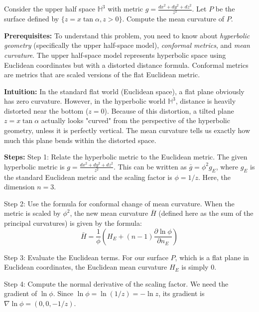 \begin{exercise}
\label{geometry:2021:4}
Consider the upper half space $\mathbb{H}^{3}$ with metric $g = \frac{dx^{2} + dy^{2} + dz^{2}}{z^{2}}$. Let $P$ be the surface defined by $\{z = x\tan\alpha, z > 0\}$. Compute the mean curvature of $P$.
\end{exercise}

\begin{solution}
\textbf{Prerequisites:}
To understand this problem, you need to know about \textit{hyperbolic geometry} (specifically the upper half-space model), \textit{conformal metrics}, and \textit{mean curvature}. The upper half-space model represents hyperbolic space using Euclidean coordinates but with a distorted distance formula. Conformal metrics are metrics that are scaled versions of the flat Euclidean metric.

\vspace{\baselineskip}
\textbf{Intuition:}
In the standard flat world (Euclidean space), a flat plane obviously has zero curvature. However, in the hyperbolic world $\mathbb{H}^3$, distance is heavily distorted near the bottom ($z=0$). Because of this distortion, a tilted plane $z = x \tan \alpha$ actually looks "curved" from the perspective of the hyperbolic geometry, unless it is perfectly vertical. The mean curvature tells us exactly how much this plane bends within the distorted space.

\vspace{\baselineskip}
\textbf{Steps:}
Step 1: Relate the hyperbolic metric to the Euclidean metric. The given hyperbolic metric is $g = \frac{dx^2 + dy^2 + dz^2}{z^2}$. This can be written as $\bar{g} = \phi^2 g_E$, where $g_E$ is the standard Euclidean metric and the scaling factor is $\phi = 1/z$. Here, the dimension $n=3$.

Step 2: Use the formula for conformal change of mean curvature. When the metric is scaled by $\phi^2$, the new mean curvature $\bar{H}$ (defined here as the sum of the principal curvatures) is given by the formula: 
\[ \bar{H} = \frac{1}{\phi} \left( H_E + (n-1) \frac{\partial \ln \phi}{\partial n_E} \right) \]

Step 3: Evaluate the Euclidean terms. For our surface $P$, which is a flat plane in Euclidean coordinates, the Euclidean mean curvature $H_E$ is simply $0$.

Step 4: Compute the normal derivative of the scaling factor. We need the gradient of $\ln \phi$. Since $\ln \phi = \ln (1/z) = -\ln z$, its gradient is $\nabla \ln \phi = (0, 0, -1/z)$. 


\end{solution}
